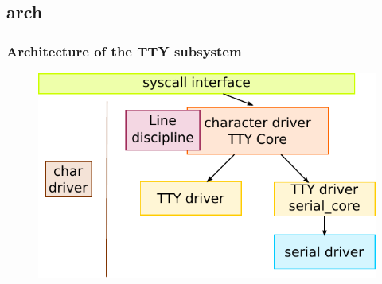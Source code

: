 \documentclass[xcolor=dvipsnames,compress]{beamer}
\begin{document}
\subsection*{arch}
\begin{frame}
\frametitle{Architecture of the TTY subsystem} 
\begin{figure}[h]
\centering
\includegraphics{tty-layer}
\end{figure}
\end{frame}
\end{document}
